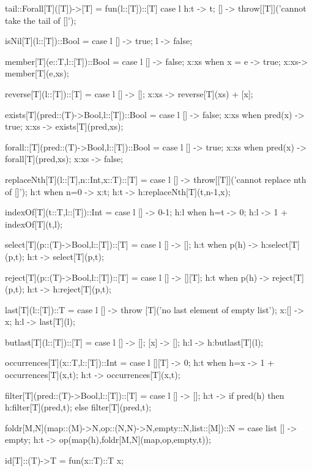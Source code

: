 \documentclass[5p,times]{elsarticle}
\begin{document}
\begin{FigESL}
tail::Forall[T]([T])->[T] = fun(l::[T])::[T]
  case l {
    h:t -> t;
    [] -> throw[[T]]('cannot take the tail of []');
  }
  
isNil[T](l::[T])::Bool =
  case l {
    [] -> true;
    l -> false;
  }
  
member[T](e::T,l::[T])::Bool =
  case l {
    [] -> false;
    x:xs when x = e -> true;
    x:xs-> member[T](e,xs);
  }
  
reverse[T](l::[T])::[T] =
  case l {
    [] -> [];
    x:xs -> reverse[T](xs) + [x];
  }

exists[T](pred::(T)->Bool,l::[T])::Bool =
  case l {
    [] -> false;
    x:xs when pred(x) -> true;
    x:xs -> exists[T](pred,xs);
  }

forall::[T](pred::(T)->Bool,l::[T])::Bool =
  case l {
    [] -> true;
    x:xs when pred(x) -> forall[T](pred,xs);
    x:xs -> false;
  }
  
replaceNth[T](l::[T],n::Int,x::T)::[T] = 
  case l {
    [] -> throw[[T]]('cannot replace nth of []');
    h:t when n=0 -> x:t;
    h:t -> h:replaceNth[T](t,n-1,x);
  }

indexOf[T](t::T,l::[T])::Int =
  case l {
    [] -> 0-1;
    h:l when h=t -> 0;
    h:l -> 1 + indexOf[T](t,l);
  }
  
select[T](p::(T)->Bool,l::[T])::[T] =
  case l {
    [] -> [];
    h:t when p(h) -> h:select[T](p,t);
    h:t -> select[T](p,t);
  }
  
reject[T](p::(T)->Bool,l::[T])::[T] =
  case l {
    [] -> [][T];
    h:t when p(h) -> reject[T](p,t);
    h:t -> h:reject[T](p,t);
  }
  
last[T](l::[T])::T =
  case l {
    [] -> throw [T]('no last element of empty list');
    x:[] -> x;
    h:l -> last[T](l);
  }
  
butlast[T](l::[T])::[T] =
  case l {
    [] -> [];
    [x] -> [];
    h:l -> h:butlast[T](l);
  }

occurrences[T](x::T,l::[T])::Int =
  case l {
    [][T] -> 0;
    h:t when h=x -> 1 + occurrences[T](x,t);
    h:t -> occurrences[T](x,t);
  }
  
filter[T](pred::(T)->Bool,l::[T])::[T] = 
  case l {
    [] -> [];
    h:t ->
      if pred(h) 
      then h:filter[T](pred,t);
      else filter[T](pred,t);
  }
  
foldr[M,N](map::(M)->N,op::(N,N)->N,empty::N,list::[M])::N =
  case list {
    [] -> empty;
    h:t -> op(map(h),foldr[M,N](map,op,empty,t));
  }
  
id[T]::(T)->T = fun(x::T)::T x;
  

\end{FigESL}
\end{document}
